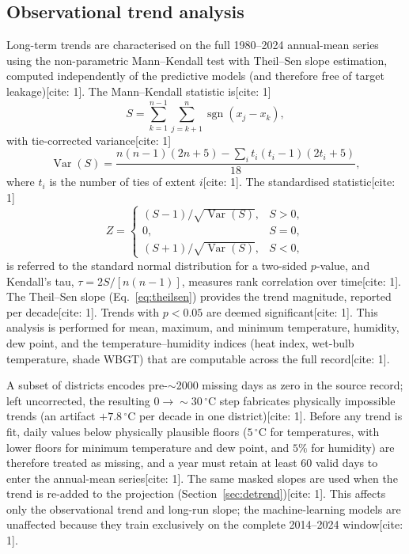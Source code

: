 \documentclass[pdflatex,sn-mathphys-ay]{sn-jnl}
\newcommand{\degC}{\ensuremath{^{\circ}\mathrm{C}}}
\begin{document}
\subsection{Observational trend analysis}\label{sec:trend}
Long-term trends are characterised on the full 1980--2024 annual-mean series using the non-parametric Mann--Kendall test with Theil--Sen slope estimation, computed independently of the predictive models (and therefore free of target leakage)[cite: 1]. The Mann--Kendall statistic is[cite: 1]
\begin{equation}
S=\sum_{k=1}^{n-1}\sum_{j=k+1}^{n}\operatorname{sgn}(x_j-x_k),
\end{equation}
with tie-corrected variance[cite: 1]
\begin{equation}
\operatorname{Var}(S)=\frac{n(n-1)(2n+5)-\sum_{i} t_i(t_i-1)(2t_i+5)}{18},
\end{equation}
where $t_i$ is the number of ties of extent $i$[cite: 1]. The standardised statistic[cite: 1]
\begin{equation}
Z=\begin{cases}
(S-1)/\sqrt{\operatorname{Var}(S)}, & S>0,\\
0, & S=0,\\
(S+1)/\sqrt{\operatorname{Var}(S)}, & S<0,
\end{cases}
\end{equation}
is referred to the standard normal distribution for a two-sided $p$-value, and Kendall's tau, $\tau = 2S/[n(n-1)]$, measures rank correlation over time[cite: 1]. The Theil--Sen slope (Eq.~\ref{eq:theilsen}) provides the trend magnitude, reported per decade[cite: 1]. Trends with $p<0.05$ are deemed significant[cite: 1]. This analysis is performed for mean, maximum, and minimum temperature, humidity, dew point, and the temperature--humidity indices (heat index, wet-bulb temperature, shade WBGT) that are computable across the full record[cite: 1].

A subset of districts encodes pre-$\sim$2000 missing days as zero in the source record; left uncorrected, the resulting $0\rightarrow\sim\!30\,\degC$ step fabricates physically impossible trends (an artifact $+7.8\,\degC$ per decade in one district)[cite: 1]. Before any trend is fit, daily values below physically plausible floors ($5\,\degC$ for temperatures, with lower floors for minimum temperature and dew point, and $5\%$ for humidity) are therefore treated as missing, and a year must retain at least 60 valid days to enter the annual-mean series[cite: 1]. The same masked slopes are used when the trend is re-added to the projection (Section~\ref{sec:detrend})[cite: 1]. This affects only the observational trend and long-run slope; the machine-learning models are unaffected because they train exclusively on the complete 2014--2024 window[cite: 1].
\end{document}
